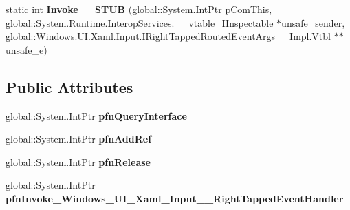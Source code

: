 \begin{DoxyCompactItemize}
\item 
\mbox{\label{struct_windows_1_1_u_i_1_1_xaml_1_1_input_1_1_right_tapped_event_handler_____impl_1_1_vtbl_aab72d66048527eeea1a50fdeab2def2d}} 
static int {\bfseries Invoke\+\_\+\+\_\+\+S\+T\+UB} (global\+::\+System.\+Int\+Ptr p\+Com\+This, global\+::\+System.\+Runtime.\+Interop\+Services.\+\_\+\+\_\+vtable\+\_\+\+I\+Inspectable $\ast$unsafe\+\_\+sender, global\+::\+Windows.\+U\+I.\+Xaml.\+Input.\+I\+Right\+Tapped\+Routed\+Event\+Args\+\_\+\+\_\+\+Impl.\+Vtbl $\ast$$\ast$unsafe\+\_\+e)
\end{DoxyCompactItemize}
\subsection*{Public Attributes}
\begin{DoxyCompactItemize}
\item 
\mbox{\label{struct_windows_1_1_u_i_1_1_xaml_1_1_input_1_1_right_tapped_event_handler_____impl_1_1_vtbl_a2ddeeafc104932a815d5992cc6f35b77}} 
global\+::\+System.\+Int\+Ptr {\bfseries pfn\+Query\+Interface}
\item 
\mbox{\label{struct_windows_1_1_u_i_1_1_xaml_1_1_input_1_1_right_tapped_event_handler_____impl_1_1_vtbl_adb871e0a4187f1d48bb78f393c997197}} 
global\+::\+System.\+Int\+Ptr {\bfseries pfn\+Add\+Ref}
\item 
\mbox{\label{struct_windows_1_1_u_i_1_1_xaml_1_1_input_1_1_right_tapped_event_handler_____impl_1_1_vtbl_a5493e7eb257bbfdc6d06013e4584ac74}} 
global\+::\+System.\+Int\+Ptr {\bfseries pfn\+Release}
\item 
\mbox{\label{struct_windows_1_1_u_i_1_1_xaml_1_1_input_1_1_right_tapped_event_handler_____impl_1_1_vtbl_a2d27c93ee98133a914cc2e82b0b8da8c}} 
global\+::\+System.\+Int\+Ptr {\bfseries pfn\+Invoke\+\_\+\+Windows\+\_\+\+U\+I\+\_\+\+Xaml\+\_\+\+Input\+\_\+\+\_\+\+Right\+Tapped\+Event\+Handler}
\end{DoxyCompactItemize}
